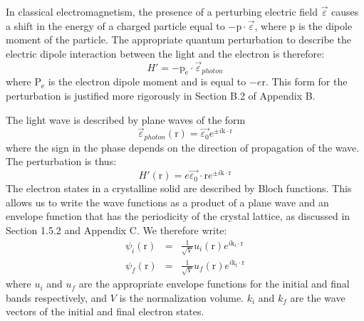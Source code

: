 \documentclass[12pt]{book}
\begin{document}
In classical electromagnetism, the presence of a perturbing electric field $\vec{\varepsilon}$ causes a shift in the energy of a charged particle equal to $-\mathrm{p}\cdot\vec{\varepsilon}$, where $\mathrm{p}$ is the dipole moment of the particle. The appropriate quantum perturbation to describe the electric dipole interaction between the light and the electron is therefore:
\begin{equation}\label{equa:3.4}
  H'=-\mathrm{p_e}\cdot\vec{\varepsilon}_{photon}
\end{equation}
where $\mathrm{P_e}$ is the electron dipole moment and is equal to $-e\mathrm{r}$. This form for the perturbation is justified more rigorously in Section B.2 of Appendix B.

The light wave is described by plane waves of the form
\begin{equation}\label{equa:3.5}
  \vec{\varepsilon}_{photon}(\mathrm{r})=\vec{\varepsilon_0}e^{\pm i \mathrm{k}\cdot\mathrm{r}}
\end{equation}
where the sign in the phase depends on the direction of propagation of the wave. The perturbation is thus:
\begin{equation}\label{equa:3.6}
  H'(\mathrm{r})=e\vec{\varepsilon_0}\cdot\mathrm{r}e^{\pm i \mathrm{k}\cdot\mathrm{r}}
\end{equation}
The electron states in a crystalline solid are described by Bloch functions. This allows us to write the wave functions as a product of a plane wave and an envelope function that has the periodicity of the crystal lattice, as discussed in Section 1.5.2 and Appendix C. We therefore write:
\begin{eqnarray}
  \psi_i(\mathrm{r}) &=& \frac{1}{\sqrt{V}}u_i(\mathrm{r})e^{i\mathrm{k_i}\cdot\mathrm{r}} \\
  \psi_f(\mathrm{r}) &=& \frac{1}{\sqrt{V}}u_f(\mathrm{r})e^{i\mathrm{k_f}\cdot\mathrm{r}}
\end{eqnarray}
where $u_i$ and $u_f$ are the appropriate envelope functions for the initial and final bands respectively, and $V$ is the normalization volume. $k_i$ and $k_f$ are the wave vectors of the initial and final electron states.
\end{document}
